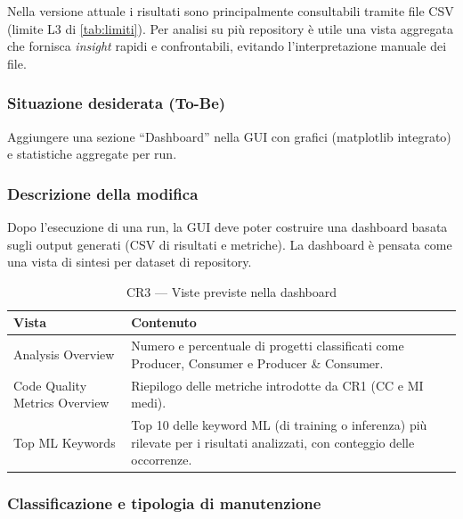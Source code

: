 \documentclass[11pt,a4paper]{article}
\newcommand{\thead}[1]{\textbf{#1}}
\begin{document}
Nella versione attuale i risultati sono principalmente consultabili tramite file
CSV (limite L3 di \cref{tab:limiti}). Per analisi su pi\`u repository \`e utile
una vista aggregata che fornisca \emph{insight} rapidi e confrontabili, evitando
l'interpretazione manuale dei file.

\subsubsection*{Situazione desiderata (To-Be)}

Aggiungere una sezione ``Dashboard'' nella GUI con grafici (matplotlib
integrato) e statistiche aggregate per run.

\subsubsection*{Descrizione della modifica}

Dopo l'esecuzione di una run, la GUI deve poter costruire una dashboard basata
sugli output generati (CSV di risultati e metriche). La dashboard \`e pensata
come una vista di sintesi per dataset di repository.

\begin{table}[H]
  \centering\small
  \caption{CR3 --- Viste previste nella dashboard}
  \label{tab:cr3-views}
  \begin{tabularx}{\linewidth}{@{}L{4.6cm} Y@{}}
    \toprule
    \thead{Vista} & \thead{Contenuto}\\
    \midrule
    Analysis Overview & Numero e percentuale di progetti classificati come
      Producer, Consumer e Producer \& Consumer.\\
    Code Quality Metrics Overview & Riepilogo delle metriche introdotte da CR1
      (CC e MI medi).\\
    Top ML Keywords & Top 10 delle keyword ML (di training o inferenza) pi\`u
      rilevate per i risultati analizzati, con conteggio delle occorrenze.\\
    \bottomrule
  \end{tabularx}
\end{table}

\subsubsection*{Classificazione e tipologia di manutenzione}
\end{document}
